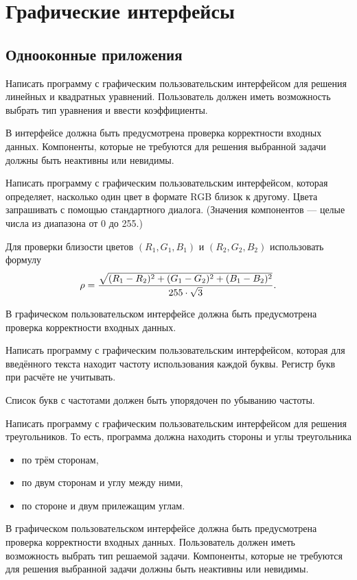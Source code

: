 \section{Графические интерфейсы}

\subsection{Однооконные приложения}

\task Написать программу с графическим пользовательским интерфейсом
для решения линейных и квадратных уравнений. Пользователь должен иметь
возможность выбрать тип уравнения и ввести коэффициенты.

В интерфейсе должна быть предусмотрена проверка корректности входных
данных. Компоненты, которые не требуются для решения выбранной задачи
должны быть неактивны или невидимы.

\task Написать программу с графическим пользовательским интерфейсом,
которая определяет, насколько один цвет в формате RGB близок к
другому. Цвета запрашивать с помощью стандартного диалога. (Значения
компонентов — целые числа из диапазона от 0 до 255.)

Для проверки близости цветов $(R_1, G_1, B_1)$ и $(R_2, G_2, B_2)$
использовать формулу
\[
\rho = {\sqrt{(R_1-R_2)^2 + (G_1-G_2)^2 + (B_1-B_2)^2} \over 255 \cdot \sqrt{3}}.
\]

В графическом пользовательском интерфейсе должна быть предусмотрена
проверка корректности входных данных.

\task Написать программу с графическим пользовательским интерфейсом,
которая для введённого текста находит частоту использования каждой
буквы. Регистр букв при расчёте не учитывать.

Список букв с частотами должен быть упорядочен по убыванию частоты.

\task Написать программу с графическим пользовательским интерфейсом
для решения треугольников. То есть, программа должна находить стороны
и углы треугольника
\begin{itemize}
\item по трём сторонам,
\item по двум сторонам и углу между ними,
\item по стороне и двум прилежащим углам.
\end{itemize}

В графическом пользовательском интерфейсе должна быть предусмотрена
проверка корректности входных данных. Пользователь должен иметь
возможность выбрать тип решаемой задачи. Компоненты, которые не
требуются для решения выбранной задачи должны быть неактивны или
невидимы.

